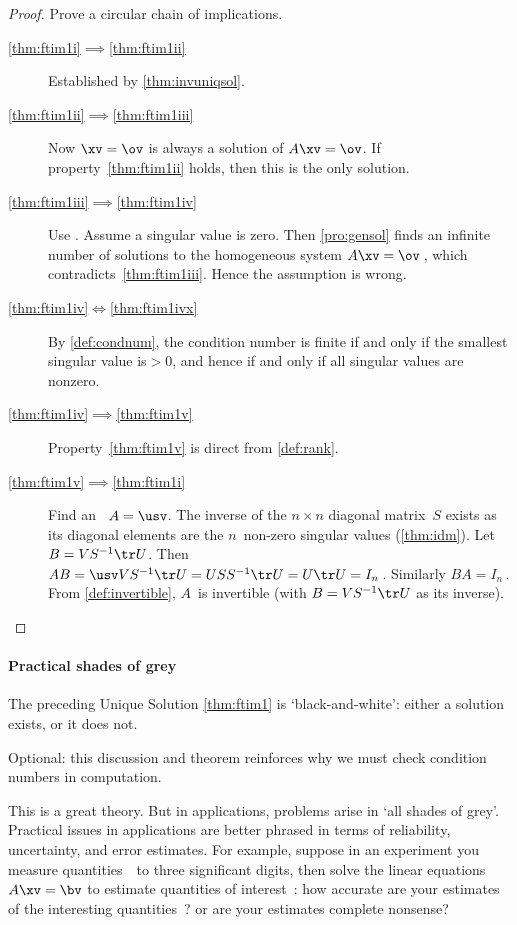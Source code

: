 \begin{proof} 
Prove a circular chain of implications. 
\begin{description}
\item[\ref{thm:ftim1i}$\implies$\ref{thm:ftim1ii}]
Established by \autoref{thm:invuniqsol}.
\item[\ref{thm:ftim1ii}$\implies$\ref{thm:ftim1iii}]
Now \(\xv=\ov\) is always a solution of \(A\xv=\ov\).  If property~\ref{thm:ftim1ii} holds, then this is the only solution.
\item[\ref{thm:ftim1iii}$\implies$\ref{thm:ftim1iv}]
Use .  
Assume a singular value is zero. 
Then \autoref{pro:gensol} finds an infinite number of solutions to the homogeneous system \(A\xv=\ov\)\,, which contradicts~\ref{thm:ftim1iii}.
Hence the assumption is wrong.
\item[\ref{thm:ftim1iv}$\iff$\ref{thm:ftim1ivx}]
By \autoref{def:condnum}, the condition number is finite if and only if the smallest singular value is\({}>0\), and hence if and only if all singular values are nonzero.
\item[\ref{thm:ftim1iv}$\implies$\ref{thm:ftim1v}]
Property~\ref{thm:ftim1v} is direct from \autoref{def:rank}.
\item[\ref{thm:ftim1v}$\implies$\ref{thm:ftim1i}]
Find an \svd\ \(A=\usv\).  
The inverse of the \(n\times n\) diagonal matrix~\(S\) exists as its diagonal elements are the \(n\)~non-zero singular values (\autoref{thm:idm}). 
Let \(B=VS^{-1}\tr U\).
Then \(AB=\usv VS^{-1}\tr U=USS^{-1}\tr U=U\tr U=I_n\)\,.  
Similarly \(BA=I_n\)\,.  
From \autoref{def:invertible}, \(A\)~is invertible (with \(B=VS^{-1}\tr U\) as its inverse).
\end{description}
\end{proof}



\paragraph{Practical shades of grey}
The preceding Unique Solution \autoref{thm:ftim1} is `black-and-white': either a solution exists, or it does not.
\begin{aside}
Optional: this discussion and theorem reinforces why we must check condition numbers in computation.
\end{aside}%
This is a great theory.
But in applications, problems arise in `all shades of grey'.
Practical issues in applications are better phrased in terms of reliability, uncertainty, and error estimates.
For example, suppose in an experiment you measure quantities~\bv\ to three significant digits, then solve the linear equations \(A\xv=\bv\) to estimate quantities of interest~\xv: how accurate are your estimates of the interesting quantities~\xv? or are your estimates complete nonsense?



